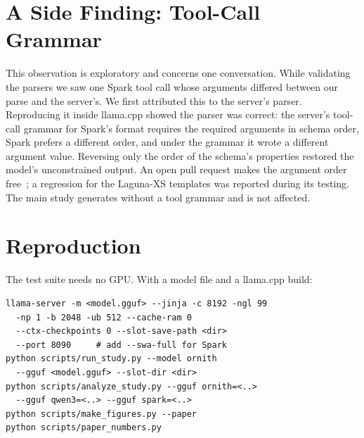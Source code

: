 \section{A Side Finding: Tool-Call Grammar}
\label{app:grammar}

This observation is exploratory and concerns one conversation.
While validating the parsers we saw one Spark tool call whose arguments
differed between our parse and the server's. We first attributed this to the
server's parser. Reproducing it inside llama.cpp showed the parser was correct:
the server's tool-call grammar for Spark's format requires the required
arguments in schema order, Spark prefers a different order, and under the
grammar it wrote a different argument value. Reversing only the order of the
schema's properties restored the model's unconstrained output. An open pull
request makes the argument order free~\cite{llamacpp-26472}; a regression for
the Laguna-XS templates was reported\onitsthread{} during its testing. The main study
generates without a tool grammar and is not affected.

\section{Reproduction}
\label{app:repro}

\artifactnote{}
The test suite needs no GPU. With a
model file and a llama.cpp build:

{\footnotesize
\begin{verbatim}
llama-server -m <model.gguf> --jinja -c 8192 -ngl 99
  -np 1 -b 2048 -ub 512 --cache-ram 0
  --ctx-checkpoints 0 --slot-save-path <dir>
  --port 8090     # add --swa-full for Spark
python scripts/run_study.py --model ornith
  --gguf <model.gguf> --slot-dir <dir>
python scripts/analyze_study.py --gguf ornith=<..>
  --gguf qwen3=<..> --gguf spark=<..>
python scripts/make_figures.py --paper
python scripts/paper_numbers.py
\end{verbatim}
}
